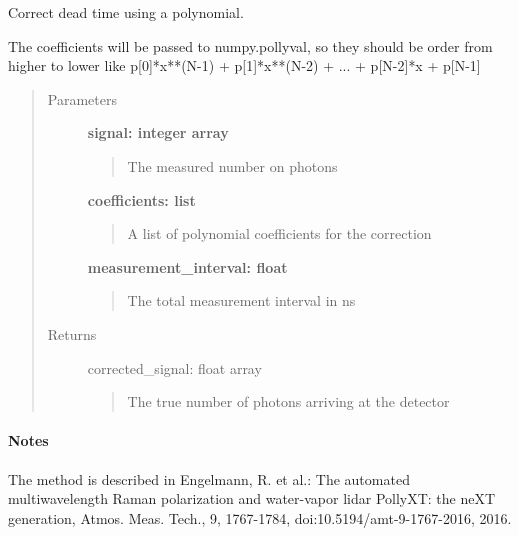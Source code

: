 \documentclass[letterpaper,10pt,english]{sphinxmanual}
\begin{document}
\begin{fulllineitems}
\label{pre_processing:pre_processing.correct_dead_time_polynomial_counts}
Correct dead time using a polynomial.

The coefficients will be passed to numpy.pollyval, so they should be order from higher to lower like
p{[}0{]}*x**(N-1) + p{[}1{]}*x**(N-2) + ... + p{[}N-2{]}*x + p{[}N-1{]}
\begin{quote}\begin{description}
\item[{Parameters}] \leavevmode
\textbf{signal: integer array}
\begin{quote}

The measured number on photons
\end{quote}

\textbf{coefficients: list}
\begin{quote}

A list of polynomial coefficients for the correction
\end{quote}

\textbf{measurement\_interval: float}
\begin{quote}

The total measurement interval in ns
\end{quote}

\item[{Returns}] \leavevmode
corrected\_signal: float array
\begin{quote}

The true number of photons arriving at the detector
\end{quote}

\end{description}\end{quote}
\paragraph{Notes}

The method is described in
Engelmann, R. et al.: The automated multiwavelength Raman polarization and water-vapor lidar PollyXT:
the neXT generation, Atmos. Meas. Tech., 9, 1767-1784, doi:10.5194/amt-9-1767-2016, 2016.

\end{fulllineitems}

\end{document}
